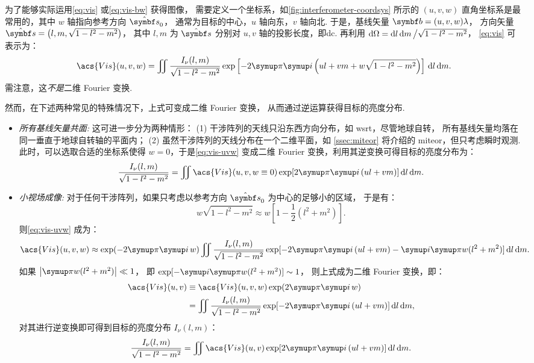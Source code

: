 为了能够实际运用\autoref{eq:vis} 或\autoref{eq:vis-bw} 获得图像，
需要定义一个坐标系，如\autoref{fig:interferometer-coordsys}
所示的 $(u,v,w)$ 直角坐标系是最常用的，其中 $w$ 轴指向参考方向 $\hat{\B{s}}_0$，
通常为目标的中心，$u$ 轴向东，$v$ 轴向北.
于是，基线矢量 $\B{b} = (u,v,w) \lambda$，
方向矢量 $\hat{\B{s}} = \left( l, m, \sqrt{1-l^2-m^2} \right)$，
其中 $l, m$ 为 $\hat{\B{s}}$ 分别对 $u, v$ 轴的投影长度，即\ac{dc}.
再利用 $\mathrm{d}\Omega = \mathrm{d}l\,\mathrm{d}m \,\big/ \sqrt{1-l^2-m^2}$，
\autoref{eq:vis} 可表示为：
\begin{equation}
  \label{eq:vis-uvw}
  \acs{Vis}(u,v,w) = \iint \frac{I_{\nu}(l,m)}{\sqrt{1-l^2-m^2}}
    \exp \left[ -2\Cpi\Ci \left( ul+vm+w\sqrt{1-l^2-m^2} \right) \right]
    \,\D{l}\,\D{m}.
\end{equation}
需注意，这\emph{不是}二维 Fourier 变换.

然而，在下述两种常见的特殊情况下，上式可变成二维 Fourier 变换，
从而通过逆运算获得目标的亮度分布.
\begin{itemize}
\item
\emph{所有基线矢量共面:}
这可进一步分为两种情形：
(1) 干涉阵列的天线只沿东西方向分布，如 \ac{wsrt}，尽管地球自转，
所有基线矢量均落在同一垂直于地球自转轴的平面内；
(2) 虽然干涉阵列的天线分布在一个二维平面，如 \autoref{ssec:miteor}
将介绍的 \ac*{miteor}，但只考虑瞬时观测.
此时，可以选取合适的坐标系使得 $w = 0$，于是\autoref{eq:vis-uvw}
变成二维 Fourier 变换，利用其逆变换可得目标的亮度分布为：
\begin{equation}
  \label{eq:vis-inv1}
  \frac{I_{\nu}(l,m)}{\sqrt{1-l^2-m^2}} = \iint \acs{Vis}(u,v, w \equiv 0)
    \exp [2\Cpi\Ci\, (ul+vm)] \,\D{l}\,\D{m}.
\end{equation}

\item
\emph{小视场成像:}
对于任何干涉阵列，如果只考虑以参考方向 $\hat{\B{s}}_0$ 为中心的足够小的区域，
于是有：
\begin{equation}
  w\sqrt{1-l^2-m^2} \approx w \left[ 1 - \frac{1}{2} (l^2+m^2) \right].
\end{equation}
则\autoref{eq:vis-uvw} 成为：
\begin{equation}
  \acs{Vis}(u,v,w) \approx \exp (-2\Cpi\Ci\,w) \iint
    \frac{I_{\nu}(l,m)}{\sqrt{1-l^2-m^2}}
    \exp [-2\Cpi\Ci\, (ul+vm) -\Ci\Cpi w(l^2+m^2)] \,\D{l}\,\D{m}.
\end{equation}
如果 $\big| \Cpi w(l^2+m^2) \big| \ll 1$，
即 $\exp [-\Ci\Cpi w(l^2+m^2)] \sim 1$，
则上式成为二维 Fourier 变换，即：
\begin{align}
  \acs{Vis}(u,v)
    & \equiv \acs{Vis}(u,v,w) \exp (2\Cpi\Ci\,w)  \\
    & = \iint \frac{I_{\nu}(l,m)}{\sqrt{1-l^2-m^2}}
    \exp [-2\Cpi\Ci\, (ul+vm)] \,\D{l}\,\D{m},
\end{align}
对其进行逆变换即可得到目标的亮度分布 $I_{\nu}(l,m)$：
\begin{equation}
  \label{eq:vis-inv2}
  \frac{I_{\nu}(l,m)}{\sqrt{1-l^2-m^2}} = \iint \acs{Vis}(u,v)
    \exp [2\Cpi\Ci\, (ul+vm)] \,\D{l}\,\D{m}.
\end{equation}

\end{itemize}

